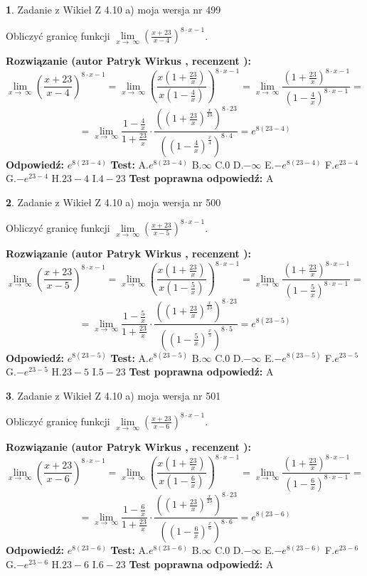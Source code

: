 \documentclass[12pt, a4paper]{article}
\theoremstyle{definition} %
\newtheorem{zad}{}
\newcommand{\zadStart}[1]{\begin{zad}#1\newline}
\newcommand{\zadStop}{\end{zad}}
\newcommand{\rozwStart}[2]{\noindent \textbf{Rozwiązanie (autor #1 , recenzent #2): }\newline}
\newcommand{\rozwStop}{\newline}
\newcommand{\odpStart}{\noindent \textbf{Odpowiedź:}\newline}
\newcommand{\odpStop}{\newline}
\newcommand{\testStart}{\noindent \textbf{Test:}\newline}
\newcommand{\testStop}{\newline}
\newcommand{\kluczStart}{\noindent \textbf{Test poprawna odpowiedź:}\newline}
\newcommand{\kluczStop}{\newline}
\begin{document}
\zadStart{Zadanie z Wikieł Z 4.10 a) moja wersja nr 499}


Obliczyć granicę funkcji  $\lim\limits_{x\to\ \infty}(\frac{x+23}{x-4})^{8\cdot x-1}$.
\zadStop
\rozwStart{Patryk Wirkus}{}
$$\lim\limits_{x\to\ \infty}(\frac{x+23}{x-4})^{8\cdot x-1} = \lim\limits_{x\to\ \infty}(\frac{x(1+\frac{23}{x})}{x(1-\frac{4}{x})})^{8\cdot x-1}=\lim\limits_{x\to\ \infty}\frac{(1+\frac{23}{x})^{8\cdot x-1}}{(1-\frac{4}{x})^{8\cdot x-1}}=$$
$$=\lim\limits_{x\to\ \infty}\frac{1-\frac{4}{x}}{1+\frac{23}{x}}\cdot\frac{((1+\frac{23}{x})^{\frac{x}{23}})^{8\cdot23}}{((1-\frac{4}{x})^{\frac{x}{4}})^{8\cdot4}}=e^{8(23-4)}$$
\rozwStop
\odpStart
$e^{8(23-4)}$
\odpStop
\testStart
A.$e^{8(23-4)}$ B.$\infty$ C.$0$ D.$-\infty$ E.$-e^{8(23-4)}$
F.$e^{23-4}$ G.$-e^{23-4}$
H.$23-4$
I.$4-23$
\testStop
\kluczStart
A
\kluczStop



\zadStart{Zadanie z Wikieł Z 4.10 a) moja wersja nr 500}


Obliczyć granicę funkcji  $\lim\limits_{x\to\ \infty}(\frac{x+23}{x-5})^{8\cdot x-1}$.
\zadStop
\rozwStart{Patryk Wirkus}{}
$$\lim\limits_{x\to\ \infty}(\frac{x+23}{x-5})^{8\cdot x-1} = \lim\limits_{x\to\ \infty}(\frac{x(1+\frac{23}{x})}{x(1-\frac{5}{x})})^{8\cdot x-1}=\lim\limits_{x\to\ \infty}\frac{(1+\frac{23}{x})^{8\cdot x-1}}{(1-\frac{5}{x})^{8\cdot x-1}}=$$
$$=\lim\limits_{x\to\ \infty}\frac{1-\frac{5}{x}}{1+\frac{23}{x}}\cdot\frac{((1+\frac{23}{x})^{\frac{x}{23}})^{8\cdot23}}{((1-\frac{5}{x})^{\frac{x}{5}})^{8\cdot5}}=e^{8(23-5)}$$
\rozwStop
\odpStart
$e^{8(23-5)}$
\odpStop
\testStart
A.$e^{8(23-5)}$ B.$\infty$ C.$0$ D.$-\infty$ E.$-e^{8(23-5)}$
F.$e^{23-5}$ G.$-e^{23-5}$
H.$23-5$
I.$5-23$
\testStop
\kluczStart
A
\kluczStop



\zadStart{Zadanie z Wikieł Z 4.10 a) moja wersja nr 501}


Obliczyć granicę funkcji  $\lim\limits_{x\to\ \infty}(\frac{x+23}{x-6})^{8\cdot x-1}$.
\zadStop
\rozwStart{Patryk Wirkus}{}
$$\lim\limits_{x\to\ \infty}(\frac{x+23}{x-6})^{8\cdot x-1} = \lim\limits_{x\to\ \infty}(\frac{x(1+\frac{23}{x})}{x(1-\frac{6}{x})})^{8\cdot x-1}=\lim\limits_{x\to\ \infty}\frac{(1+\frac{23}{x})^{8\cdot x-1}}{(1-\frac{6}{x})^{8\cdot x-1}}=$$
$$=\lim\limits_{x\to\ \infty}\frac{1-\frac{6}{x}}{1+\frac{23}{x}}\cdot\frac{((1+\frac{23}{x})^{\frac{x}{23}})^{8\cdot23}}{((1-\frac{6}{x})^{\frac{x}{6}})^{8\cdot6}}=e^{8(23-6)}$$
\rozwStop
\odpStart
$e^{8(23-6)}$
\odpStop
\testStart
A.$e^{8(23-6)}$ B.$\infty$ C.$0$ D.$-\infty$ E.$-e^{8(23-6)}$
F.$e^{23-6}$ G.$-e^{23-6}$
H.$23-6$
I.$6-23$
\testStop
\kluczStart
A
\kluczStop
\end{document}

